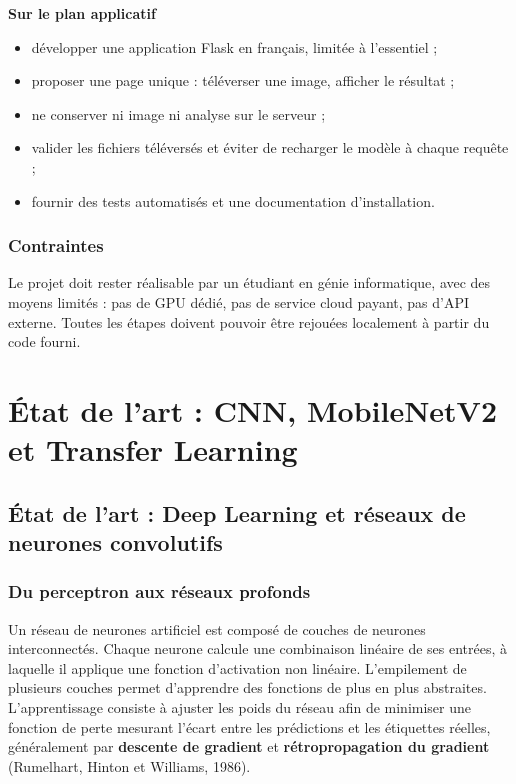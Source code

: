 \documentclass[10pt,a4paper]{article}
\begin{document}
\textbf{Sur le plan applicatif}

\begin{itemize}
\item développer une application Flask en français, limitée à l'essentiel ;
\item proposer une page unique : téléverser une image, afficher le résultat ;
\item ne conserver ni image ni analyse sur le serveur ;
\item valider les fichiers téléversés et éviter de recharger le modèle à chaque requête ;
\item fournir des tests automatisés et une documentation d'installation.
\end{itemize}

\subsubsection{Contraintes}

Le projet doit rester réalisable par un étudiant en génie informatique, avec des moyens limités : pas de GPU dédié, pas de service cloud payant, pas d'API externe. Toutes les étapes doivent pouvoir être rejouées localement à partir du code fourni.

\clearpage

\section{État de l'art : CNN, MobileNetV2 et Transfer Learning}
\label{sec:2}%

\subsection{État de l'art : Deep Learning et réseaux de neurones convolutifs}

\subsubsection{Du perceptron aux réseaux profonds}

Un réseau de neurones artificiel est composé de couches de neurones interconnectés. Chaque neurone calcule une combinaison linéaire de ses entrées, à laquelle il applique une fonction d'activation non linéaire. L'empilement de plusieurs couches permet d'apprendre des fonctions de plus en plus abstraites. L'apprentissage consiste à ajuster les poids du réseau afin de minimiser une fonction de perte mesurant l'écart entre les prédictions et les étiquettes réelles, généralement par \textbf{descente de gradient} et \textbf{rétropropagation du gradient} (Rumelhart, Hinton et Williams, 1986).
\end{document}
